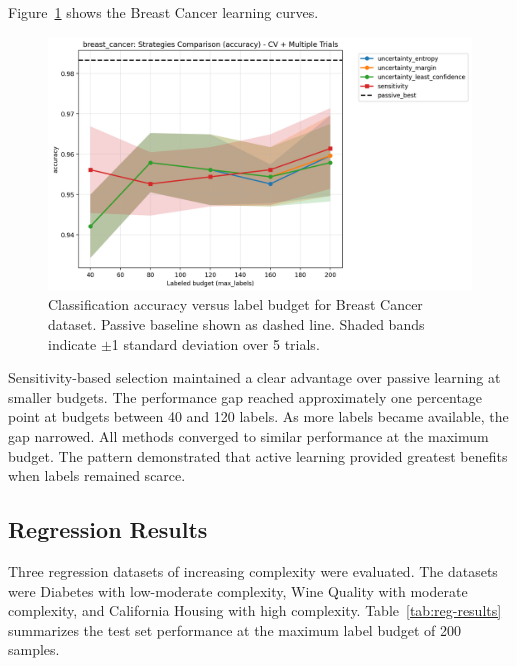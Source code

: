 \documentclass[conference]{IEEEtran}
\begin{document}
Figure~\ref{fig:breast-compare} shows the Breast Cancer learning curves.

\begin{figure}[t]
\centering
\includegraphics[width=0.95\columnwidth]{figures/cls_breast_cancer_comparison_accuracy.png}
\caption{Classification accuracy versus label budget for Breast Cancer dataset. Passive baseline shown as dashed line. Shaded bands indicate $\pm$1 standard deviation over 5 trials.}
\label{fig:breast-compare}
\end{figure}

Sensitivity-based selection maintained a clear advantage over passive learning at smaller budgets. The performance gap reached approximately one percentage point at budgets between 40 and 120 labels. As more labels became available, the gap narrowed. All methods converged to similar performance at the maximum budget. The pattern demonstrated that active learning provided greatest benefits when labels remained scarce.

\subsection{Regression Results}

Three regression datasets of increasing complexity were evaluated. The datasets were Diabetes with low-moderate complexity, Wine Quality with moderate complexity, and California Housing with high complexity. Table~\ref{tab:reg-results} summarizes the test set performance at the maximum label budget of 200 samples.
\end{document}
